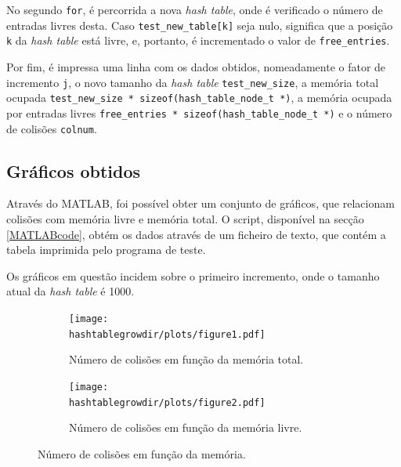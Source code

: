 \documentclass[portuguese,11pt,a4paper,titlepage]{article}
\newcommand{\srcdir}{..}
\newcommand{\hashtablegrowdir}{\srcdir/hash\_table\_grow-test}
\begin{document}


No segundo \lstinline|for|, é percorrida a nova \textit{hash table}, onde é verificado o número de entradas livres desta. Caso \lstinline|test_new_table[k]| seja nulo, significa que a posição \lstinline|k| da \textit{hash table} está livre, e, portanto, é incrementado o valor de \lstinline|free_entries|.



Por fim, é impressa uma linha com os dados obtidos, nomeadamente o fator de incremento \lstinline|j|, o novo tamanho da \textit{hash table} \lstinline|test_new_size|, a memória total ocupada \lstinline|test_new_size * sizeof(hash_table_node_t *)|, a memória ocupada por entradas livres \lstinline|free_entries * sizeof(hash_table_node_t *)| e o número de colisões \lstinline|colnum|.



\subsection{Gráficos obtidos}
Através do MATLAB, foi possível obter um conjunto de gráficos, que relacionam colisões com memória livre e memória total. O script, disponível na secção \ref{MATLABcode}, obtém os dados através de um ficheiro de texto, que contém a tabela imprimida pelo programa de teste.

Os gráficos em questão incidem sobre o primeiro incremento, onde o tamanho atual da \textit{hash table} é 1000.

\begin{figure}[h]
	\begin{subfigure}{0.47\textwidth}
		\texttt{[image: \\hashtablegrowdir/plots/figure1.pdf]} 
		\caption{Número de colisões em função da memória total.}
		\label{fig:htg_col_mem_total}
	\end{subfigure}
	\hspace{0.049\textwidth}
	\begin{subfigure}{0.47\textwidth}
		\texttt{[image: \\hashtablegrowdir/plots/figure2.pdf]}
		\caption{Número de colisões em função da memória livre.}
		\label{fig:htg_col_mem_free}
	\end{subfigure}
	
	\caption{Número de colisões em função da memória.}
	\label{fig:htg_col_mem}
\end{figure}
\end{document}
